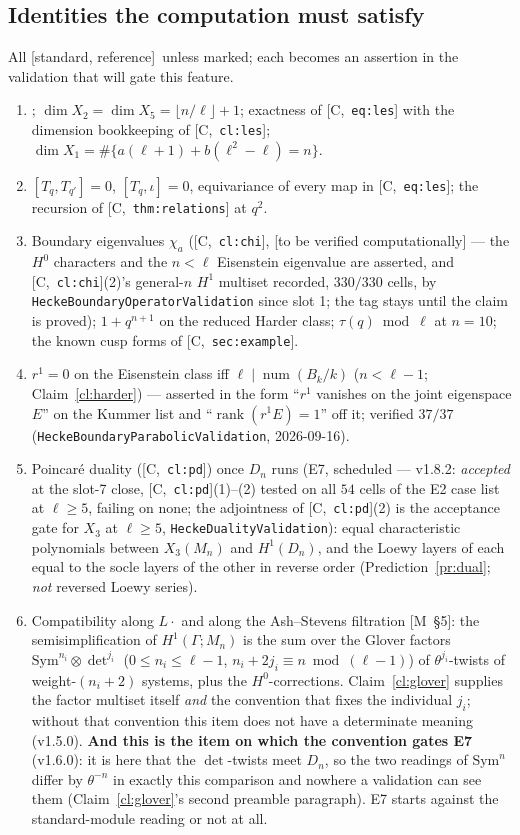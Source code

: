 \documentclass[11pt]{article}
\theoremstyle{remark}
\newcommand{\Sym}{\mathrm{Sym}}
\newcommand{\Ga}{\Gamma}
\DeclareMathOperator{\rank}{rank}
\DeclareMathOperator{\num}{num}
\newcommand{\Mn}{M_n}
\newcommand{\Dn}{D_n}
\newcommand{\HA}[1]{[C,~\texttt{#1}]}      %
\newcommand{\Mnote}[1]{[M~\S#1]}            %
\newcommand{\STD}{\textsf{[standard, reference]}}
\newcommand{\VERIFY}{\textsf{[to be verified computationally]}}
\begin{document}
\subsection{Identities the computation must satisfy}\label{sec:identities}
All \STD\ unless marked; each becomes an assertion in the validation that will gate this
feature.
\begin{enumerate}
\item \HA{cl:dimH1}; $\dim X_2=\dim X_5=\lfloor n/\ell\rfloor+1$; exactness of
  \HA{eq:les} with the dimension bookkeeping of \HA{cl:les};
  $\dim X_1=\#\{a(\ell+1)+b(\ell^2-\ell)=n\}$.
\item $[T_q,T_{q'}]=0$, $[T_q,\iota]=0$, equivariance of every map in \HA{eq:les};
  the recursion of \HA{thm:relations} at $q^2$.
\item Boundary eigenvalues $\chi_a$ (\HA{cl:chi}, \VERIFY{} --- the $H^0$ characters and the
  $n<\ell$ Eisenstein eigenvalue are asserted, and \HA{cl:chi}(2)'s general-$n$ $H^1$ multiset
  recorded, $330/330$ cells, by \texttt{HeckeBoundaryOperatorValidation} since slot 1; the
  tag stays until the claim is proved); $1+q^{n+1}$ on the reduced
  Harder class; $\tau(q)\bmod\ell$ at $n=10$; the known cusp forms of \HA{sec:example}.
\item $r^1=0$ on the Eisenstein class iff $\ell\mid\num(B_k/k)$ ($n<\ell-1$;
  Claim~\ref{cl:harder}) --- asserted in the form ``$r^1$ vanishes on the joint eigenspace
  $E$'' on the Kummer list and ``$\rank(r^1E)=1$'' off it; verified $37/37$
  (\texttt{HeckeBoundaryParabolicValidation}, 2026-09-16).
\item Poincar\'e duality (\HA{cl:pd}) once $\Dn$ runs (E7, scheduled --- v1.8.2: \emph{accepted}
  at the slot-7 close, \HA{cl:pd}(1)--(2) tested on all $54$ cells of the E2 case list at
  $\ell\ge5$, failing on none; the adjointness of
  \HA{cl:pd}(2) is the acceptance gate for $X_3$ at $\ell\ge5$,
  \texttt{HeckeDualityValidation}): equal characteristic polynomials
  between $X_3(\Mn)$ and $H^1(\Dn)$, and the Loewy layers of each equal to the socle layers of
  the other in reverse order (Prediction~\ref{pr:dual}; \emph{not} reversed Loewy series).
\item Compatibility along $L\cdot$ and along the Ash--Stevens filtration \Mnote{5}: the
  semisimplification of $H^1(\Ga;\Mn)$ is the sum over the Glover factors
  $\Sym^{n_i}\otimes\det^{j_i}$ ($0\le n_i\le\ell-1$, $n_i+2j_i\equiv n\bmod(\ell-1)$) of
  $\theta^{j_i}$-twists of weight-$(n_i+2)$ systems, plus the $H^0$-corrections.
  Claim~\ref{cl:glover} supplies the factor multiset itself \emph{and} the convention that
  fixes the individual $j_i$; without that convention this item does not have a
  determinate meaning (v1.5.0). \textbf{And this is the item on which the convention gates
  E7} (v1.6.0): it is here that the $\det$-twists meet $\Dn$, so the two readings of
  $\Sym^n$ differ by $\theta^{-n}$ in exactly this comparison and nowhere a validation can
  see them (Claim~\ref{cl:glover}'s second preamble paragraph). E7 starts against the
  standard-module reading or not at all.


\end{enumerate}
\end{document}
